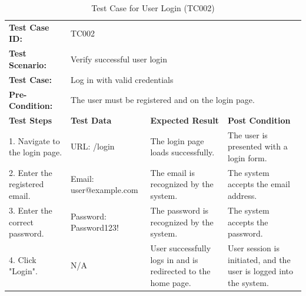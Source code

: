 \documentclass{scrreprt}
\begin{document}
\begin{longtable}{| m{2cm} | m{5cm} | m{4cm} | m{3cm} |}
\caption{Test Case for User Login (TC002)}
\vspace{0.5cm} \\ \hline
\textbf{Test Case ID:} & \multicolumn{3}{l|}{TC002} \\ \hline
\textbf{Test Scenario:} & \multicolumn{3}{l|}{Verify successful user login} \\ \hline
\textbf{Test Case:} & \multicolumn{3}{l|}{Log in with valid credentials} \\ \hline
\textbf{Pre-Condition:} & \multicolumn{3}{l|}{The user must be registered and on the login page.} \\ \hline
\textbf{Test Steps} & \textbf{Test Data} & \textbf{Expected Result} & \textbf{Post Condition} \\ \hline
1. Navigate to the login page. & URL: /login & The login page loads successfully. & The user is presented with a login form. \\ \hline
2. Enter the registered email. & Email: user@example.com & The email is recognized by the system. & The system accepts the email address. \\ \hline
3. Enter the correct password. & Password: Password123! & The password is recognized by the system. & The system accepts the password. \\ \hline
4. Click "Login". & N/A & User successfully logs in and is redirected to the home page. & User session is initiated, and the user is logged into the system. \\ \hline
\end{longtable}

\vspace{1cm}
\end{document}
